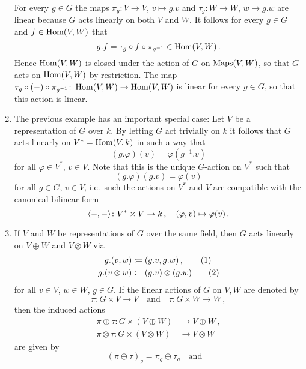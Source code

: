 \begin{example}
\begin{enumerate}
      For every $g \in G$ the maps $\pi_g \colon V \to V$, $v \mapsto g.v$ and $\tau_g \colon W \to W$, $w \mapsto g.w$ are linear because $G$ acts linearly on both $V$ and $W$.
      It follows for every $g \in G$ and $f \in \operatorname{Hom}(V,W)$ that
      \[
            g.f
        =   \tau_g \circ f \circ \pi_{g^{-1}}
        \in \operatorname{Hom}(V,W) \,.
      \]
      Hence $\operatorname{Hom}(V,W)$ is closed under the action of $G$ on $\operatorname{Maps}(V,W)$, so that $G$ acts on $\operatorname{Hom}(V,W)$ by restriction.
      The map $\tau_g \circ (-) \circ \pi_{g^{-1}} \colon \operatorname{Hom}(V,W) \to \operatorname{Hom}(V,W)$ is linear for every $g \in G$, so that this action is linear.
    \item
      The previous example has an important special case:
      Let $V$ be a representation of $G$ over $k$.
      By letting $G$ act trivially on $k$ it follows that $G$ acts linearly on $V^* = \operatorname{Hom}(V,k)$ in such a way that
      \[
          (g.\varphi)(v)
        = \varphi( g^{-1}.v )
      \]
      for all $\varphi \in V^*$, $v \in V$.
      Note that this is the unique $G$-action on $V^*$ such that
      \[
          (g.\varphi)(g.v)
        = \varphi(v)
      \]
      for all $g \in G$, $v \in V$, i.e.\ such the actions on $V^*$ and $V$ are compatible with the canonical bilinear form
      \[
                \langle -, - \rangle
        \colon  V^* \times V
        \to     k \,,
        \quad   (\varphi, v)
        \mapsto \varphi(v) \,.
      \]
    \item
      If $V$ and $W$ be representations of $G$ over the same field, then $G$ acts linearly on $V \oplus W$ and $V \otimes W$ via
      \begin{align*}
                  g.(v,w)
        &\coloneqq (g.v,g.w) \,,       \tag{1}
        \\
                  g.(v \otimes w)
        &\coloneqq (g.v) \otimes (g.w) \tag{2}
      \end{align*}
      for all $v \in V$, $w \in W$, $g \in G$.
      If the linear actions of $G$ on $V, W$ are denoted by
      \[
        \pi \colon G \times V \to V
        \quad\text{and}\quad
        \tau \colon G \times W \to W \,,
      \]
      then the induced actions
      \begin{align*}
        \pi \oplus \tau  \colon G \times (V \oplus W)  &\to V \oplus W  \,,
        \\
        \pi \otimes \tau \colon G \times (V \otimes W) &\to V \otimes W
      \end{align*}
      are given by
      \[
          (\pi \oplus \tau)_g
        = \pi_g \oplus \tau_g
        \quad\text{and}\quad
\]
\end{enumerate}
\end{example}
